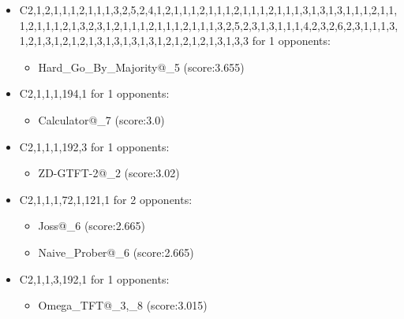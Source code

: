 \begin{appendices}
\begin{itemize}
        \item C2,1,2,1,1,1,2,1,1,1,3,2,5,2,4,1,2,1,1,1,2,1,1,1,2,1,1,1,2,1,1,1,3,1,3,1,3,1,1,1,2,1,1,1,2,1,1,1,2,1,3,2,3,1,2,1,1,1,2,1,1,1,2,1,1,1,3,2,5,2,3,1,3,1,1,1,4,2,3,2,6,2,3,1,1,1,3,1,2,1,3,1,2,1,2,1,3,1,3,1,3,1,3,1,2,1,2,1,2,1,3,1,3,3 for 1 opponents:
        \begin{multicols}{3}
            \begin{itemize}
                \item Hard\_Go\_By\_Majority@\_5 (score:3.655)
            \end{itemize}
        \end{multicols}

        \item C2,1,1,1,194,1 for 1 opponents:
        \begin{multicols}{3}
            \begin{itemize}
                \item Calculator@\_7 (score:3.0)
            \end{itemize}
        \end{multicols}

        \item C2,1,1,1,192,3 for 1 opponents:
        \begin{multicols}{3}
            \begin{itemize}
                \item ZD-GTFT-2@\_2 (score:3.02)
            \end{itemize}
        \end{multicols}

        \item C2,1,1,1,72,1,121,1 for 2 opponents:
        \begin{multicols}{3}
            \begin{itemize}
                \item Joss@\_6 (score:2.665)
                \item Naive\_Prober@\_6 (score:2.665)
            \end{itemize}
        \end{multicols}

        \item C2,1,1,3,192,1 for 1 opponents:
        \begin{multicols}{3}
            \begin{itemize}
                \item Omega\_TFT@\_3,\_8 (score:3.015)
            \end{itemize}
        \end{multicols}


\end{itemize}
\end{appendices}
